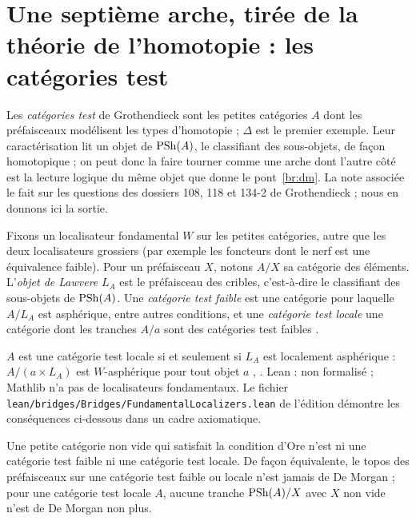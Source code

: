 \section{Une septième arche, tirée de la théorie de l'homotopie : les catégories test}\label{sec:homotopical}

Les \emph{catégories test} de Grothendieck sont les petites catégories $A$ dont les préfaisceaux modélisent les types d'homotopie ; $\Delta$ est le premier exemple. Leur caractérisation lit un objet de $\mathrm{PSh}(A)$, le classifiant des sous-objets, de façon homotopique ; on peut donc la faire tourner comme une arche dont l'autre côté est la lecture logique du même objet que donne le pont~\ref{br:dm}. La note associée \cite[section ]{bridges-notes} le fait sur les questions des dossiers 108, 118 et 134-2 de Grothendieck ; nous en donnons ici la sortie.

Fixons un localisateur fondamental $W$ sur les petites catégories, autre que les deux localisateurs grossiers (par exemple les foncteurs dont le nerf est une équivalence faible). Pour un préfaisceau $X$, notons $A/X$ sa catégorie des éléments. L'\emph{objet de Lawvere} $L_A$ est le préfaisceau des cribles, c'est-à-dire le classifiant des sous-objets de $\mathrm{PSh}(A)$. Une \emph{catégorie test faible} est une catégorie pour laquelle $A/L_A$ est asphérique, entre autres conditions, et une \emph{catégorie test locale} une catégorie dont les tranches $A/a$ sont des catégories test faibles \cite[déf.~4.1.8, 4.1.12]{cisinski-308}.

\begin{bridge}\label{br:test}
$A$ est une catégorie test locale si et seulement si $L_A$ est localement asphérique : $A/(a\times L_A)$ est $W$-asphérique pour tout objet $a$ \cite[th.~4.1.19]{cisinski-308}, \cite[th.~1.5.6]{maltsiniotis-301}. Lean : non formalisé ; Mathlib n'a pas de localisateurs fondamentaux. Le fichier \texttt{lean/bridges/Bridges/FundamentalLocalizers.lean} de l'édition démontre les conséquences ci-dessous dans un cadre axiomatique.
\end{bridge}

\begin{theorem}\label{th:testore}
Une petite catégorie non vide qui satisfait la condition d'Ore n'est ni une catégorie test faible ni une catégorie test locale. De façon équivalente, le topos des préfaisceaux sur une catégorie test faible ou locale n'est jamais de De Morgan ; pour une catégorie test locale $A$, aucune tranche $\mathrm{PSh}(A)/X$ avec $X$ non vide n'est de De Morgan non plus.
\end{theorem}

